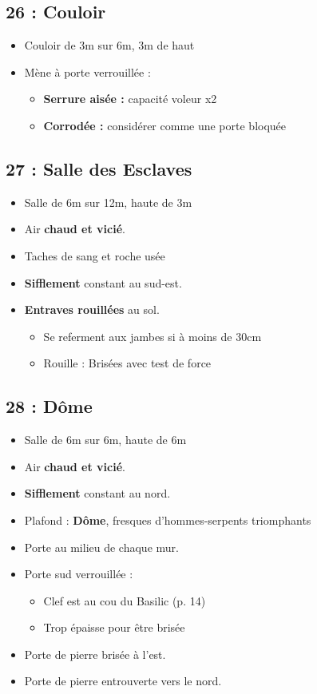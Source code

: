 \subsection{26 : Couloir}\label{n3:s26}
\begin{itemize}
  \item Couloir de 3m sur 6m, 3m de haut
  \item Mène à porte verrouillée :
  \begin{itemize}
    \item \textbf{Serrure aisée :} capacité voleur x2
    \item \textbf{Corrodée :} considérer comme une porte bloquée
  \end{itemize}
\end{itemize}

\subsection{27 : Salle des Esclaves}\label{n3:s27}
\begin{itemize}
  \item Salle de 6m sur 12m, haute de 3m
  \item Air \textbf{chaud et vicié}. 
  \item Taches de sang et roche usée
  \item \textbf{Sifflement} constant au sud-est.
  \item \textbf{Entraves rouillées} au sol.
  \begin{itemize}
    \item Se referment aux jambes si à moins de 30cm
    \item Rouille : Brisées avec test de force
  \end{itemize}
\end{itemize}

\vfill
\pagebreak
\subsection{28 : Dôme}\label{n3:s28}
\begin{itemize}
  \item Salle de 6m sur 6m, haute de 6m
  \item Air \textbf{chaud et vicié}. 
  \item \textbf{Sifflement} constant au nord.
  \item Plafond : \textbf{Dôme},  fresques d’hommes-serpents triomphants
  \item Porte au milieu de chaque mur.
  \item Porte sud verrouillée :
  \begin{itemize}
    \item Clef est au cou du Basilic (p. 14)
    \item Trop épaisse pour être brisée
  \end{itemize}
  \item Porte de pierre brisée à l’est. 
  \item Porte de pierre entrouverte vers le nord.
\end{itemize}

